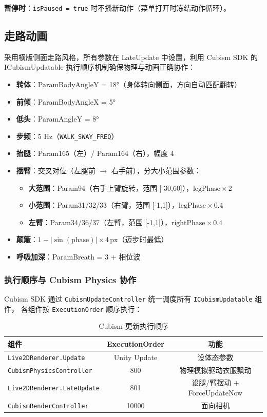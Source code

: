 \documentclass[12pt,a4paper]{ctexart}
\begin{document}
\textbf{暂停时}：\texttt{isPaused = true} 时不播新动作（菜单打开时冻结动作循环）。

\subsection{走路动画}

采用横版侧面走路风格，所有参数在 LateUpdate 中设置，利用 Cubism SDK 的 ICubismUpdatable 执行顺序机制确保物理与动画正确协作：

\begin{itemize}
    \item \textbf{转体}：ParamBodyAngleY = 18°（身体转向侧面，方向自动匹配翻转）
    \item \textbf{前倾}：ParamBodyAngleX = 5°
    \item \textbf{低头}：ParamAngleY = 8°
    \item \textbf{步频}：5 Hz（\texttt{WALK\_SWAY\_FREQ}）
    \item \textbf{抬腿}：Param165（左）/ Param164（右），幅度 4
    \item \textbf{摆臂}：交叉对位（左腿前 $\to$ 右手前），分大小范围参数：
        \begin{itemize}
            \item \textbf{大范围}：Param94（右手上臂旋转，范围 [-30,60]），$\text{legPhase}\times 2$
            \item \textbf{小范围}：Param31/32/33（右臂，范围 [-1,1]），$\text{legPhase}\times 0.4$
            \item \textbf{左臂}：Param34/36/37（左臂，范围 [-1,1]），$\text{rightPhase}\times 0.4$
        \end{itemize}
    \item \textbf{颠簸}：$1 - |\sin(\text{phase})|\times 4\,\text{px}$（迈步时最低）
    \item \textbf{呼吸加深}：ParamBreath = 3 + 相位波
\end{itemize}

\subsubsection{执行顺序与 Cubism Physics 协作}

Cubism SDK 通过 \texttt{CubismUpdateController} 统一调度所有 \texttt{ICubismUpdatable} 组件，
各组件按 \texttt{ExecutionOrder} 顺序执行：

\begin{table}[H]
\centering
\caption{Cubism 更新执行顺序}
\label{tab:exec-order}
\begin{tabular}{p{}cc}
\toprule
\textbf{组件} & \textbf{ExecutionOrder} & \textbf{功能} \\
\midrule
\texttt{Live2DRenderer.Update} & Unity Update & 设体态参数 \\
\texttt{CubismPhysicsController} & 800 & 物理模拟驱动衣服飘动 \\
\texttt{Live2DRenderer.LateUpdate} & 801 & 设腿/臂摆动 + ForceUpdateNow \\
\texttt{CubismRenderController} & 10000 & 面向相机 \\
\bottomrule
\end{tabular}
\end{table}
\end{document}

